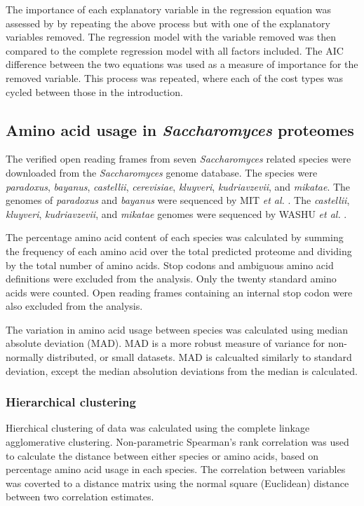 The importance of each explanatory variable in the regression equation was assessed by by repeating the above process but with one of the explanatory variables removed. The regression model with the variable removed was then compared to the complete regression model with all factors included. The AIC difference between the two equations was used as a measure of importance for the removed variable. This process was repeated, where each of the cost types was cycled between those in the introduction.

\subsection{Amino acid usage in \emph{Saccharomyces} proteomes}

The verified open reading frames from seven \emph{Saccharomyces} related species were downloaded from the \emph{Saccharomyces} genome database. The species were \emph{paradoxus}, \emph{bayanus}, \emph{castellii}, \emph{cerevisiae}, \emph{kluyveri}, \emph{kudriavzevii}, and \emph{mikatae}. The genomes of \emph{paradoxus} and \emph{bayanus} were sequenced by MIT \emph{et al.} \cite{mit_paper}. The \emph{castellii}, \emph{kluyveri}, \emph{kudriavzevii}, and \emph{mikatae} genomes were sequenced by WASHU \emph{et al.} \cite{washu}.

The percentage amino acid content of each species was calculated by summing the frequency of each amino acid over the total predicted proteome and dividing by the total number of amino acids. Stop codons and ambiguous amino acid definitions were excluded from the analysis. Only the twenty standard amino acids were counted. Open reading frames containing an internal stop codon were also excluded from the analysis.

The variation in amino acid usage between species was calculated using median absolute deviation (MAD). MAD is a more robust measure of variance for non-normally distributed, or small datasets. MAD is calcualted similarly to standard deviation, except the median absolution deviations from the median is calculated.

\subsubsection{Hierarchical clustering}

Hierchical clustering of data was calculated using the complete linkage agglomerative clustering. Non-parametric Spearman's rank correlation was used to calculate the distance between either species or amino acids, based on percentage amino acid usage in each species. The correlation between variables was coverted to a distance matrix using the normal square (Euclidean) distance between two correlation estimates.

